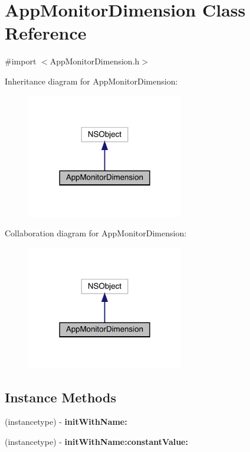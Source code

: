 \hypertarget{interface_app_monitor_dimension}{}\section{App\+Monitor\+Dimension Class Reference}
\label{interface_app_monitor_dimension}


{\ttfamily \#import $<$App\+Monitor\+Dimension.\+h$>$}



Inheritance diagram for App\+Monitor\+Dimension\+:\nopagebreak
\begin{figure}[H]
\begin{center}
\leavevmode
\includegraphics[width=194pt]{interface_app_monitor_dimension__inherit__graph}
\end{center}
\end{figure}


Collaboration diagram for App\+Monitor\+Dimension\+:\nopagebreak
\begin{figure}[H]
\begin{center}
\leavevmode
\includegraphics[width=194pt]{interface_app_monitor_dimension__coll__graph}
\end{center}
\end{figure}
\subsection*{Instance Methods}
\begin{DoxyCompactItemize}
\item 
\mbox{\label{interface_app_monitor_dimension_a5666ce312132cbca80fbc2617a9df00b}} 
(instancetype) -\/ {\bfseries init\+With\+Name\+:}
\item 
\mbox{\label{interface_app_monitor_dimension_a5cf232e5e140b2f6275791d01d05a314}} 
(instancetype) -\/ {\bfseries init\+With\+Name\+:constant\+Value\+:}
\end{DoxyCompactItemize}
